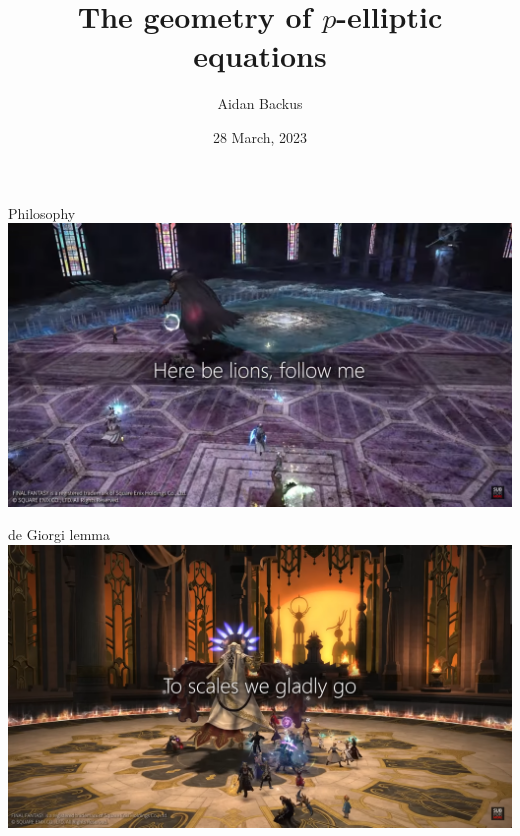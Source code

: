 \documentclass[10pt]{beamer}
\title{The geometry of \texorpdfstring{$p$-elliptic}{p-elliptic} equations}
\date{28 March, 2023}
\author{Aidan Backus}
\institute{Brown University}
\begin{document}
\maketitle


\begin{frame}{Philosophy}
    \centering
    \includegraphics[width=\textwidth]{hic_svnt_leones}
\end{frame}

\begin{frame}{de Giorgi lemma}
    \centering
    \includegraphics[width=\textwidth]{to_scales}
\end{frame}
\end{document}
